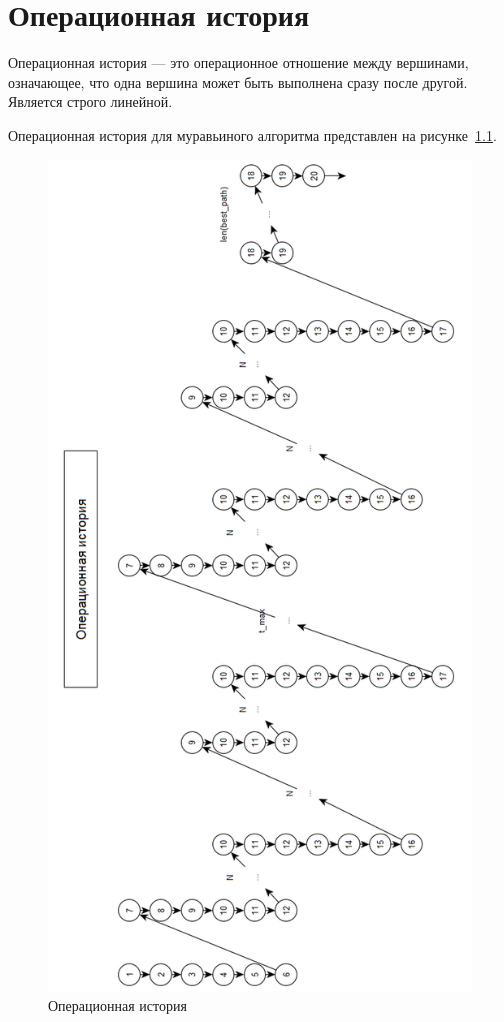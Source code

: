 \documentclass[a4paper, 12pt]{extreport}
\begin{document}
\chapter{Операционная история}

Операционная история --- это операционное отношение между вершинами, означающее, что одна вершина может быть 
выполнена сразу после другой. Является строго линейной.

Операционная история для муравьиного алгоритма представлен на рисунке~\ref{graph-op-hist}.

\begin{figure}[h]
	\centering
	\includegraphics[scale=0.6]{tools/graph-op-hist.png}
	\caption{Операционная история}
	\label{graph-op-hist}
\end{figure}
\end{document}

